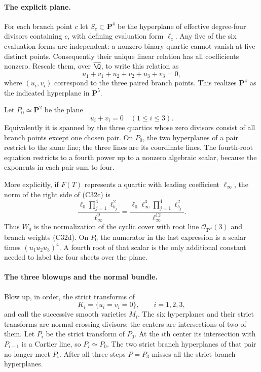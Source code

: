 \paragraph{The explicit plane.}
For each branch point $c$ let $S_c\subset\mathbf P^4$
be the hyperplane of effective degree-four divisors
containing $c$, with defining evaluation form $\ell_c$.
Any five of the six evaluation forms are independent:
a nonzero binary quartic cannot vanish at five
distinct points.  Consequently their unique linear
relation has all coefficients nonzero.  Rescale
them, over $\overline\Q$, to write this relation as
\[
       u_1+v_1+u_2+v_2+u_3+v_3=0,
                                                        \tag{C32g}
\]
where $(u_i,v_i)$ correspond to the three paired
branch points.  This realizes $\mathbf P^4$ as
the indicated hyperplane in $\mathbf P^5$.

Let $P_0\simeq\mathbf P^2$ be the plane
\[
                         u_i+v_i=0\quad(1\leq i\leq3).
                                                        \tag{C32h}
\]
Equivalently it is spanned by the three quartics
whose zero divisors consist of all branch points
except one chosen pair.  On $P_0$, the two
hyperplanes of a pair restrict to the same line;
the three lines are its coordinate lines.
The fourth-root equation restricts to a fourth
power up to a nonzero algebraic scalar, because
the exponents in each pair sum to four.

More explicitly, if $F(T)$ represents a quartic
with leading coefficient $\ell_\infty$, the norm
of the right side of (C32c) is
\[
 \frac{\ell_0\prod_{j=1}^4\ell_{b_j}^2}
                         {\ell_\infty^9}
 =\frac{\ell_0\ell_\infty^3
                 \prod_{j=1}^4\ell_{b_j}^2}
                         {\ell_\infty^{12}}.
                                                        \tag{C32i}
\]
Thus $W_0$ is the normalization of the cyclic
cover with root line $\mathcal O_{\mathbf P^4}(3)$
and branch weights (C32d).  On $P_0$ the numerator
in the last expression is a scalar times
$(u_1u_2u_3)^4$.  A fourth root of that scalar
is the only additional constant needed to label
the four sheets over the plane.

\paragraph{The three blowups and the normal bundle.}
Blow up, in order, the strict transforms of
\[
                 K_i=\{u_i=v_i=0\},\qquad i=1,2,3,
\]
and call the successive smooth varieties $M_i$.
The six hyperplanes and their strict transforms
are normal-crossing divisors; the centers are
intersections of two of them.  Let $P_i$ be the
strict transform of $P_0$.  At the $i$th center
its intersection with $P_{i-1}$ is a Cartier
line, so $P_i\simeq P_0$.  The two strict branch
hyperplanes of that pair no longer meet $P_i$.
After all three steps $P=P_3$ misses all the
strict branch hyperplanes.


